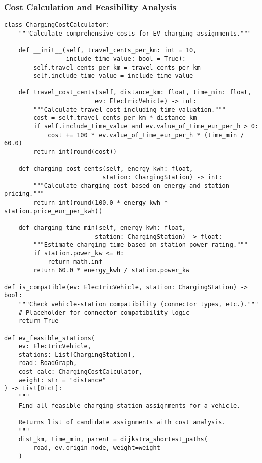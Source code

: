 \documentclass[12pt,a4paper]{article}
\begin{document}
\subsubsection{Cost Calculation and Feasibility Analysis}

\begin{lstlisting}[caption=Comprehensive Cost Calculation]
class ChargingCostCalculator:
    """Calculate comprehensive costs for EV charging assignments."""
    
    def __init__(self, travel_cents_per_km: int = 10, 
                 include_time_value: bool = True):
        self.travel_cents_per_km = travel_cents_per_km
        self.include_time_value = include_time_value
    
    def travel_cost_cents(self, distance_km: float, time_min: float, 
                         ev: ElectricVehicle) -> int:
        """Calculate travel cost including time valuation."""
        cost = self.travel_cents_per_km * distance_km
        if self.include_time_value and ev.value_of_time_eur_per_h > 0:
            cost += 100 * ev.value_of_time_eur_per_h * (time_min / 60.0)
        return int(round(cost))
    
    def charging_cost_cents(self, energy_kwh: float, 
                           station: ChargingStation) -> int:
        """Calculate charging cost based on energy and station pricing."""
        return int(round(100.0 * energy_kwh * station.price_eur_per_kwh))
    
    def charging_time_min(self, energy_kwh: float, 
                         station: ChargingStation) -> float:
        """Estimate charging time based on station power rating."""
        if station.power_kw <= 0:
            return math.inf
        return 60.0 * energy_kwh / station.power_kw

def is_compatible(ev: ElectricVehicle, station: ChargingStation) -> bool:
    """Check vehicle-station compatibility (connector types, etc.)."""
    # Placeholder for connector compatibility logic
    return True

def ev_feasible_stations(
    ev: ElectricVehicle,
    stations: List[ChargingStation],
    road: RoadGraph,
    cost_calc: ChargingCostCalculator,
    weight: str = "distance"
) -> List[Dict]:
    """
    Find all feasible charging station assignments for a vehicle.
    
    Returns list of candidate assignments with cost analysis.
    """
    dist_km, time_min, parent = dijkstra_shortest_paths(
        road, ev.origin_node, weight=weight
    )
    

\end{lstlisting}
\end{document}
